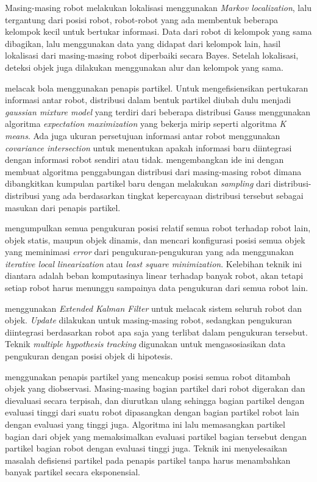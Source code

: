 Masing-masing robot \citet{pahliani2006} melakukan lokalisasi menggunakan \textit{Markov localization}, lalu tergantung dari posisi robot, robot-robot yang ada membentuk beberapa kelompok kecil untuk bertukar informasi. Data dari robot di kelompok yang sama dibagikan, lalu menggunakan data yang didapat dari kelompok lain, hasil lokalisasi dari masing-masing robot diperbaiki secara Bayes. Setelah lokalisasi, deteksi objek juga dilakukan menggunakan alur dan kelompok yang sama.

\citet{santos2009} melacak bola menggunakan penapis partikel. Untuk mengefisiensikan pertukaran informasi antar robot, distribusi dalam bentuk partikel diubah dulu menjadi \textit{gaussian mixture model} yang terdiri dari beberapa distribusi Gauss menggunakan algoritma \textit{expectation maximization} yang bekerja mirip seperti algoritma \textit{K means}. Ada juga ukuran persetujuan informasi antar robot menggunakan \textit{covariance intersection} untuk menentukan apakah informasi baru diintegrasi dengan informasi robot sendiri atau tidak. \citet{ahmad2011} mengembangkan ide ini dengan membuat algoritma penggabungan distribusi dari masing-masing robot dimana dibangkitkan kumpulan partikel baru dengan melakukan \textit{sampling} dari distribusi-distribusi yang ada berdasarkan tingkat kepercayaan distribusi tersebut sebagai masukan dari penapis partikel.

\citet{ahmad2013} mengumpulkan semua pengukuran posisi relatif semua robot terhadap robot lain, objek statis, maupun objek dinamis, dan mencari konfigurasi posisi semua objek yang meminimasi \textit{error} dari pengukuran-pengukuran yang ada menggunakan \textit{iterative local linearization} atau \textit{least square minimization}. Kelebihan teknik ini diantara adalah beban komputasinya linear terhadap banyak robot, akan tetapi setiap robot harus menunggu sampainya data pengukuran dari semua robot lain.

\citet{chang2016} menggunakan \textit{Extended Kalman Filter} untuk melacak sistem seluruh robot dan objek. \textit{Update} dilakukan untuk masing-masing robot, sedangkan pengukuran diintegrasi berdasarkan robot apa saja yang terlibat dalam pengukuran tersebut. Teknik \textit{multiple hypothesis tracking} digunakan untuk mengasosiasikan data pengukuran dengan posisi objek di hipotesis.

\citet{ahmad2017} menggunakan penapis partikel yang mencakup posisi semua robot ditambah objek yang diobservasi. Masing-masing bagian partikel dari robot digerakan dan dievaluasi secara terpisah, dan diurutkan ulang sehingga bagian partikel dengan evaluasi tinggi dari suatu robot dipasangkan dengan bagian partikel robot lain dengan evaluasi yang tinggi juga. Algoritma ini lalu memasangkan partikel bagian dari objek yang memaksimalkan evaluasi partikel bagian tersebut dengan partikel bagian robot dengan evaluasi tinggi juga. Teknik ini menyelesaikan masalah defisiensi partikel pada penapis partikel tanpa harus menambahkan banyak partikel secara eksponensial.
